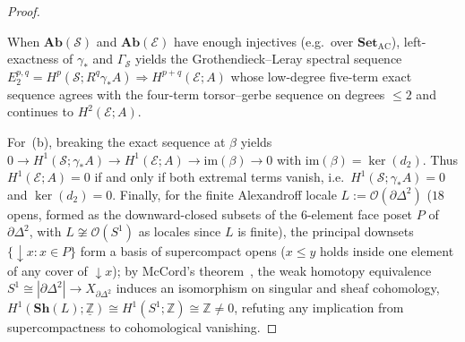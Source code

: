 \begin{proof}
\begin{itemize}
\end{itemize}
When $\mathbf{Ab}(\mathcal{S})$ and $\mathbf{Ab}(\mathcal{E})$ have enough injectives (e.g.\ over $\mathbf{Set}_{\mathrm{AC}}$), left-exactness of $\gamma_*$ and $\Gamma_{\mathcal{S}}$ yields the Grothendieck--Leray spectral sequence $E_2^{p,q} = H^p(\mathcal{S}; R^q\gamma_* A) \Longrightarrow H^{p+q}(\mathcal{E}; A)$ whose low-degree five-term exact sequence agrees with the four-term torsor--gerbe sequence on degrees $\le 2$ and continues to $H^2(\mathcal{E}; A)$.

For~(b), breaking the exact sequence at $\beta$ yields $0 \to H^1(\mathcal{S}; \gamma_* A) \to H^1(\mathcal{E}; A) \to \mathrm{im}(\beta) \to 0$ with $\mathrm{im}(\beta) = \ker(d_2)$. Thus $H^1(\mathcal{E}; A) = 0$ if and only if both extremal terms vanish, i.e.\ $H^1(\mathcal{S}; \gamma_* A) = 0$ and $\ker(d_2) = 0$. Finally, for the finite Alexandroff locale $L := \mathcal{O}(\partial\Delta^2)$ ($18$ opens, formed as the downward-closed subsets of the $6$-element face poset $P$ of $\partial\Delta^2$, with $L \not\cong \mathcal{O}(S^1)$ as locales since $L$ is finite), the principal downsets $\{\downarrow x : x \in P\}$ form a basis of supercompact opens ($x \le y$ holds inside one element of any cover of $\downarrow x$); by McCord's theorem~\cite[Theorem~1]{McCord66}, the weak homotopy equivalence $S^1 \cong |\partial\Delta^2| \to X_{\partial\Delta^2}$ induces an isomorphism on singular and sheaf cohomology, $H^1(\mathbf{Sh}(L); \underline{\mathbb{Z}}) \cong H^1(S^1; \mathbb{Z}) \cong \mathbb{Z} \neq 0$, refuting any implication from supercompactness to cohomological vanishing.
\end{proof}

